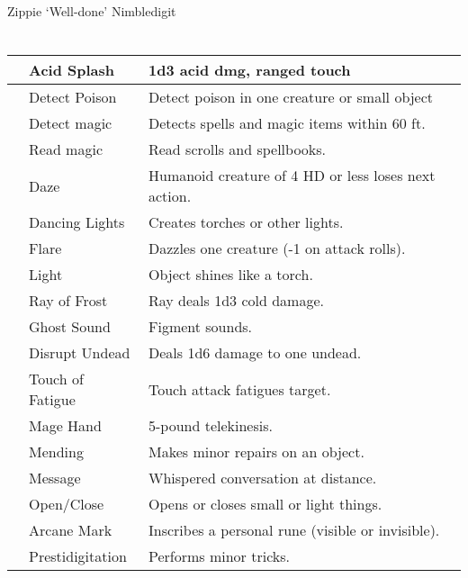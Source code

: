 \documentclass[12pt]{article}
\begin{document}
\vspace{2em}\vspace{-2em} \\
Zippie `Well-done' Nimbledigit

\section*{}
\normalfont
\begin{tabular}{|l|l|l|}
\hline
\hspace{0.5em} & Acid Splash & 1d3 acid dmg, ranged touch \\
\hline
& Detect Poison & Detect poison in one creature or small object \\
\hline
& Detect magic &  Detects spells and magic items within 60 ft. \\
\hline
& Read magic & Read scrolls and spellbooks. \\
\hline
& Daze & Humanoid creature of 4 HD or less loses next action. \\
\hline
&Dancing Lights& Creates torches or other lights.\\
\hline
&Flare& Dazzles one creature (-1 on attack rolls).\\
\hline
&Light& Object shines like a torch.\\
\hline
&Ray of Frost& Ray deals 1d3 cold damage.\\
\hline
&Ghost Sound& Figment sounds.\\
\hline
&Disrupt Undead& Deals 1d6 damage to one undead. \\
\hline
&Touch of Fatigue& Touch attack fatigues target.\\
\hline
&Mage Hand& 5-pound telekinesis.\\
\hline
&Mending& Makes minor repairs on an object.\\
\hline
&Message& Whispered conversation at distance.\\
\hline
&Open/Close& Opens or closes small or light things.\\
\hline
& Arcane Mark & Inscribes a personal rune (visible or invisible). \\
\hline
&Prestidigitation & Performs minor tricks.\\
\hline
\end{tabular}
\end{document}
